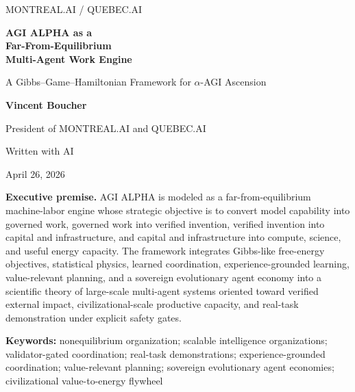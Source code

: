\documentclass[11pt]{article}
\begin{document}
\begin{titlepage}
\thispagestyle{empty}
\pagecolor{AgiMist}
\vspace*{0.7cm}
\begin{center}
\begin{tcolorbox}[enhanced,width=0.86\textwidth,colback=white,colframe=AgiLine,boxrule=0.55pt,arc=3pt,left=8pt,right=8pt,top=8pt,bottom=8pt]
\centering\Large\textsc{MONTREAL.AI / QUEBEC.AI}
\end{tcolorbox}
\vspace{1.05cm}
\begin{tcolorbox}[enhanced,width=0.92\textwidth,colback=white,colframe=AgiBlue!45,boxrule=0.6pt,arc=4pt,left=12pt,right=12pt,top=12pt,bottom=12pt]
\centering
{\fontsize{29}{34}\selectfont\bfseries\color{AgiBlue} AGI ALPHA as a\\[0.18em] Far-From-Equilibrium\\[0.18em] Multi-Agent Work Engine\par}
\vspace{0.45cm}
{\Large A Gibbs--Game--Hamiltonian Framework for $\alpha$-AGI Ascension\par}
\end{tcolorbox}
\vspace{0.8cm}
{\Large\bfseries Vincent Boucher\par}
\vspace{0.12cm}
{\normalsize President of MONTREAL.AI and QUEBEC.AI\par}
{\normalsize Written with AI\par}
\vspace{0.12cm}
{\normalsize April 26, 2026\par}
\vspace{0.75cm}

\begin{executivebox}
\textbf{Executive premise.} AGI ALPHA is modeled as a far-from-equilibrium machine-labor engine whose strategic objective is to convert model capability into governed work, governed work into verified invention, verified invention into capital and infrastructure, and capital and infrastructure into compute, science, and useful energy capacity. The framework integrates Gibbs-like free-energy objectives, statistical physics, learned coordination, experience-grounded learning, value-relevant planning, and a sovereign evolutionary agent economy into a scientific theory of large-scale multi-agent systems oriented toward verified external impact, civilizational-scale productive capacity, and real-task demonstration under explicit safety gates.
\end{executivebox}
\vfill

\begin{goldbox}
\centering\small\textbf{Keywords:} nonequilibrium organization; scalable intelligence organizations; validator-gated coordination; real-task demonstrations; experience-grounded coordination; value-relevant planning; sovereign evolutionary agent economies; civilizational value-to-energy flywheel
\end{goldbox}
\end{center}
\end{titlepage}
\end{document}
